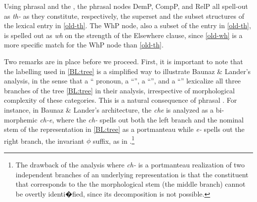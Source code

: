 \noindent Using phrasal  and the , the phrasal nodes DemP, CompP, and RelP all spell-out as \textit{th-} as they constitute, respectively, the superset and the subset structures of the lexical entry in \ref{old-th}. The WhP node, also a subset of the entry in \ref{old-th}, is spelled out as \textit{wh} on the strength of the Elsewhere clause, since \ref{old-wh} is a more specific match for the WhP node than \ref{old-th}. 
\par
Two remarks are in place before we proceed. First, it is important to note that the labelling used in \ref{BL:tree} is a simplified way to illustrate Baunaz \& Lander's analysis, in the sense that a `` pronoun,  a ``'', a ``'', and a ``'' lexicalize all three branches of the tree \ref{BL:tree} in their analysis, irrespective of morphological complexity of these categories. This is a natural consequence of phrasal . For instance, in Baunaz \& Lander's architecture, the  \textit{che} is analyzed as a bi-morphemic \textit{ch-e}, where the \textit{ch-}  spells out both the left branch and the nominal stem of the representation in \ref{BL:tree} as a portmanteau while \textit{e-} spells out the right branch, the invariant $\phi$ suffix, as in \Next.\footnote{The drawback of the analysis where \textit{ch-} is a portmanteau realization of two independent branches of an underlying representation is that the constituent that corresponds to the the morphological stem (the middle branch) cannot be overtly identi�fied, since its decomposition is not possible.
}%

